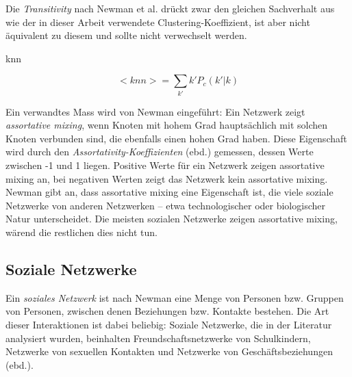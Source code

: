 Die \emph{Transitivity} nach Newman et al. dr\"uckt zwar den gleichen
Sachverhalt aus wie der in dieser Arbeit verwendete
Clustering-Koeffizient, ist aber nicht \"aquivalent zu diesem und
sollte nicht verwechselt werden.

knn

\begin{equation}
  \label{eq:9}
  <knn> = \sum_{k'} k'P_c (k'|k)
\end{equation}

Ein verwandtes Mass wird von Newman eingef\"uhrt: Ein Netzwerk zeigt
\emph{assortative mixing}, wenn Knoten mit hohem Grad haupts\"achlich
mit solchen Knoten verbunden sind, die ebenfalls einen hohen Grad
haben\cite{PhysRevLett.89.208701}. Diese Eigenschaft wird durch den
\emph{Assortativity-Koeffizienten} (ebd.)  gemessen, dessen Werte
zwischen -1 und 1 liegen. Positive Werte f\"ur ein Netzwerk zeigen
assortative mixing an, bei negativen Werten zeigt das Netzwerk kein
assortative mixing. Newman gibt an, dass assortative mixing eine
Eigenschaft ist, die viele soziale Netzwerke von anderen Netzwerken --
etwa technologischer oder biologischer Natur unterscheidet. Die
meisten sozialen Netzwerke zeigen assortative mixing, w\"arend die
restlichen dies nicht tun.

\subsection{Soziale Netzwerke}
\label{sec:soziale-netzwerke}

Ein \emph{soziales Netzwerk} ist nach Newman\cite{newman:167} eine
Menge von Personen bzw. Gruppen von Personen, zwischen denen
Beziehungen bzw. Kontakte bestehen. Die Art dieser Interaktionen ist
dabei beliebig: Soziale Netzwerke, die in der Literatur analysiert
wurden, beinhalten Freundschaftsnetzwerke von Schulkindern, Netzwerke
von sexuellen Kontakten und Netzwerke von Gesch\"aftsbeziehungen
(ebd.).

